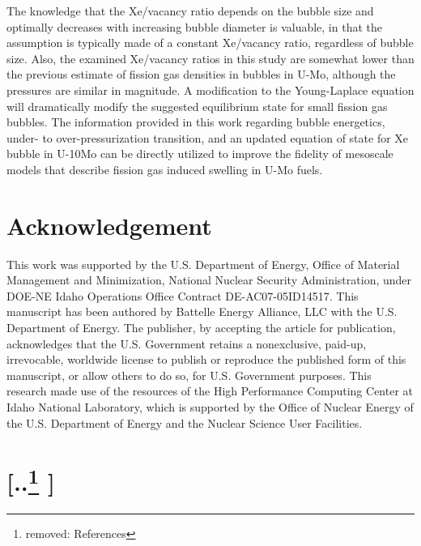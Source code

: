 \documentclass[review]{elsarticle}
\providecommand{\DIFdeltex}[1]{{\protect\color{red} [..\footnote{removed: #1} ]}} %
\providecommand{\DIFdelbegin}{} %
\providecommand{\DIFdelend}{} %
\providecommand{\DIFdel}[1]{\texorpdfstring{\DIFdeltex{#1}}{}} %
\newcommand{\DIFscaledelfig}{0.5}
\newlength{\DIFdelgraphicswidth} %
\newlength{\DIFdelgraphicsheight} %
\newcommand{\DIFdelincludegraphics}[2][]{%
\sbox{\DIFdelgraphicsbox}{\DIFOincludegraphics[#1]{#2}}%
\settoboxwidth{\DIFdelgraphicswidth}{\DIFdelgraphicsbox} %
\settoboxtotalheight{\DIFdelgraphicsheight}{\DIFdelgraphicsbox} %
\scalebox{\DIFscaledelfig}{%
\parbox[b]{\DIFdelgraphicswidth}{\usebox{\DIFdelgraphicsbox}\\[-\baselineskip] \rule{\DIFdelgraphicswidth}{0em}}\llap{\resizebox{\DIFdelgraphicswidth}{\DIFdelgraphicsheight}{%
\setlength{\unitlength}{\DIFdelgraphicswidth}%
\begin{picture}(1,1)%
\thicklines\linethickness{2pt} %
{\color[rgb]{1,0,0}\put(0,0){\framebox(1,1){}}}%
{\color[rgb]{1,0,0}\put(0,0){\line( 1,1){1}}}%
{\color[rgb]{1,0,0}\put(0,1){\line(1,-1){1}}}%
\end{picture}%
}\hspace*{3pt}}} %
} %
\DeclareRobustCommand{\DIFdelbegin}{\DIFOdelbegin \let\includegraphics\DIFdelincludegraphics} %
\DeclareRobustCommand{\DIFdelend}{\DIFOaddend \let\includegraphics\DIFOincludegraphics} %
\begin{document}
The knowledge that the Xe/vacancy ratio depends on the bubble size and optimally decreases with increasing bubble diameter is valuable, in that the assumption is typically made of a constant Xe/vacancy ratio, regardless of bubble size. Also, the examined Xe/vacancy ratios in this study are somewhat lower than the previous estimate of fission gas densities in bubbles in U-Mo, although the pressures are similar in magnitude. A modification to the Young-Laplace equation will dramatically modify the suggested equilibrium state for small fission gas bubbles. The information provided in this work regarding bubble energetics, under- to over-pressurization transition, and an updated equation of state for Xe bubble in U-10Mo can be directly utilized to improve the fidelity of mesoscale models that describe fission gas induced swelling in U-Mo fuels. 

\section{Acknowledgement}
This work was supported by the U.S. Department of Energy, Office of Material Management and Minimization, National Nuclear Security Administration, under DOE-NE Idaho Operations Office Contract DE-AC07-05ID14517. This manuscript has been authored by Battelle Energy Alliance, LLC with the U.S. Department of Energy. The publisher, by accepting the article for publication, acknowledges that the U.S. Government retains a nonexclusive, paid-up, irrevocable, worldwide license to publish or reproduce the published form of this manuscript, or allow others to do so, for U.S. Government purposes. This research made use of the resources of the High Performance Computing Center at Idaho National Laboratory, which is supported by the Office of Nuclear Energy of the U.S. Department of Energy and the Nuclear Science User Facilities.

\DIFdelbegin \section{\DIFdel{References}}
\addtocounter{section}{-1}%
\DIFdelend %


\end{document}
